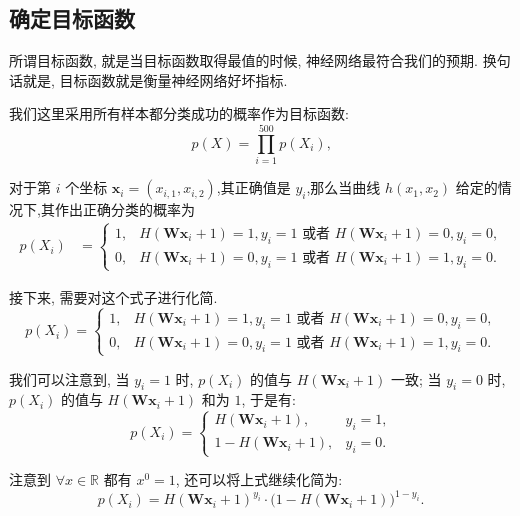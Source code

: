 \subsection{确定目标函数}
\begin{frame}{\insertsection}{\insertsubsection}
所谓目标函数, 就是当目标函数取得最值的时候, 神经网络最符合我们的预期. 换句话就是, 目标函数就是衡量神经网络好坏指标.

我们这里采用所有样本都分类成功的概率作为目标函数:
\[
p(X) = \prod_{i = 1}^{500} p(X_i)\text{,}
\]

对于第 $i$ 个坐标 $\bm{x}_i = (x_{i, 1}, x_{i, 2})$,其正确值是 $y_i$,那么当曲线 $h(x_1, x_2)$ 给定的情况下,其作出正确分类的概率为%
%
\begin{align*}
  p(X_i) &= \left\{
  \begin{array}{ll}
    1, & \text{$H(\bm{W}\bm{x}_i + 1) = 1, y_i = 1$ 或者 $H(\bm{W}\bm{x}_i + 1) = 0, y_i = 0$,}\\
    0, & \text{$H(\bm{W}\bm{x}_i + 1) = 0, y_i = 1$ 或者 $H(\bm{W}\bm{x}_i + 1) = 1, y_i = 0$.}
  \end{array}
  \right.
\end{align*}
\end{frame}

\begin{frame}{\insertsection}{\insertsubsection}
接下来, 需要对这个式子进行化简.
\[
  p(X_i) = \left\{
  \begin{array}{ll}
    1, & \text{$H(\bm{W}\bm{x}_i + 1) = 1, y_i = 1$ 或者 $H(\bm{W}\bm{x}_i + 1) = 0, y_i = 0$,}\\
    0, & \text{$H(\bm{W}\bm{x}_i + 1) = 0, y_i = 1$ 或者 $H(\bm{W}\bm{x}_i + 1) = 1, y_i = 0$.}
  \end{array}
  \right.
\]

我们可以注意到, 当 $y_i = 1$ 时, $p(X_i)$ 的值与 $H(\bm{W}\bm{x}_i + 1)$ 一致; 当 $y_i = 0$ 时, $p(X_i)$ 的值与 $H(\bm{W}\bm{x}_i + 1)$ 和为 $1$, 于是有:
\[
  p(X_i) = \left\{
  \begin{array}{ll}
    H(\bm{W}\bm{x}_i + 1), & y_i = 1\text{,}\\
    1 - H(\bm{W}\bm{x}_i + 1), & y_i = 0\text{.}
  \end{array}
  \right.
\]

注意到 $\forall x \in \mathbb{R}$ 都有 $x^0 = 1$, 还可以将上式继续化简为:
\[
  p(X_i) = H(\bm{W}\bm{x}_i + 1)^{y_i}\cdot\big(1 - H(\bm{W}\bm{x}_i + 1)\big)^{1 - y_i}\text{.}
\]
\end{frame}

